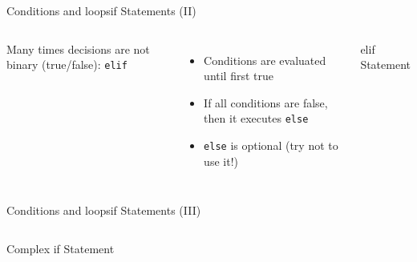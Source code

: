 \documentclass[10pt,compress]{beamer} %
\begin{document}
\begin{frame}{Conditions and loops}{if Statements (II)}
    \begin{columns}
	Many times decisions are not binary (true/false): \texttt{elif}
		\begin{itemize}
		\item Conditions are evaluated until first true
		\item If all conditions are false, then it executes \texttt{else}
		\item \texttt{else} is optional (try not to use it!)
		\end{itemize}

		\begin{block}{elif Statement}
		\vspace{-0.2cm}
		
		\vspace{-0.3cm}
		\end{block}
	\end{columns}
\end{frame}

\begin{frame}{Conditions and loops}{if Statements (III)}
    \begin{columns}
		\begin{exampleblock}{Complex if Statement}
		\vspace{-0.2cm}
		
		\vspace{-0.3cm}
		\end{exampleblock}
	\end{columns}
\end{frame}
\end{document}
